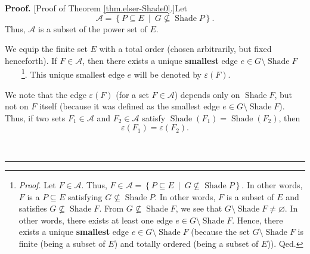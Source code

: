 \documentclass[numbers=enddot,12pt,final,onecolumn]{scrartcl}%
\theoremstyle{definition}
\newenvironment{proof}[1][Proof]{\noindent\textbf{#1.} }{\ \rule{0.5em}{0.5em}}
\newenvironment{verlong}{}{}
\begin{document}
\begin{verlong}
\begin{proof}
[Proof of Theorem \ref{thm.elser-Shade0}.]Let
\begin{equation}
\mathcal{A}=\left\{  P\subseteq E\ \mid\ G\not \subseteq \operatorname*{Shade}%
P\right\}  . \label{pf.thm.elser-Shade0.A=}%
\end{equation}
Thus, $\mathcal{A}$ is a subset of the power set of $E$.

We equip the finite set $E$ with a total order (chosen arbitrarily, but fixed
henceforth). If $F\in\mathcal{A}$, then there exists a unique
\textbf{smallest} edge $e\in G\setminus\operatorname*{Shade}F$%
\ \ \ \ \footnote{\textit{Proof.} Let $F\in\mathcal{A}$. Thus, $F\in
\mathcal{A}=\left\{  P\subseteq E\ \mid\ G\not \subseteq \operatorname*{Shade}%
P\right\}  $. In other words, $F$ is a $P\subseteq E$ satisfying
$G\not \subseteq \operatorname*{Shade}P$. In other words, $F$ is a subset of
$E$ and satisfies $G\not \subseteq \operatorname*{Shade}F$. From
$G\not \subseteq \operatorname*{Shade}F$, we see that $G\setminus
\operatorname*{Shade}F\neq\varnothing$. In other words, there exists at least
one edge $e\in G\setminus\operatorname*{Shade}F$. Hence, there exists a unique
\textbf{smallest} edge $e\in G\setminus\operatorname*{Shade}F$ (because the
set $G\setminus\operatorname*{Shade}F$ is finite (being a subset of $E$) and
totally ordered (being a subset of $E$)). Qed.}. This unique smallest edge $e$
will be denoted by $\varepsilon\left(  F\right)  $.

We note that the edge $\varepsilon\left(  F\right)  $ (for a set
$F\in\mathcal{A}$) depends only on $\operatorname*{Shade}F$, but not on $F$
itself (because it was defined as the smallest edge $e\in G\setminus
\operatorname*{Shade}F$). Thus, if two sets $F_{1}\in\mathcal{A}$ and
$F_{2}\in\mathcal{A}$ satisfy $\operatorname*{Shade}\left(  F_{1}\right)
=\operatorname*{Shade}\left(  F_{2}\right)  $, then
\begin{equation}
\varepsilon\left(  F_{1}\right)  =\varepsilon\left(  F_{2}\right)  .
\label{pf.thm.elser-Shade0.eps=eps}%
\end{equation}



\end{proof}
\end{verlong}
\end{document}
